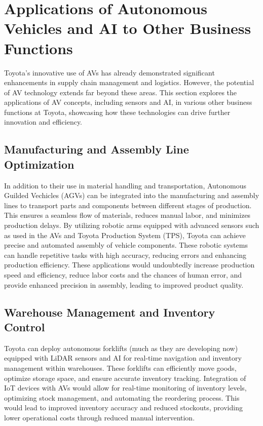 \section{Applications of Autonomous Vehicles and AI to Other Business Functions}

Toyota's innovative use of AVs has already demonstrated significant enhancements in supply chain management and logistics. However, the potential of AV technology extends far beyond these areas. This section explores the applications of AV concepts, including sensors and AI, in various other business functions at Toyota, showcasing how these technologies can drive further innovation and efficiency.

\subsection{Manufacturing and Assembly Line Optimization}
In addition to their use in material handling and transportation, Autonomous Guilded Vechicles (AGVs) can be integrated into the manufacturing and assembly lines to transport parts and components between different stages of production. This ensures a seamless flow of materials, reduces manual labor, and minimizes production delays. By utilizing robotic arms equipped with advanced sensors such as used in the AVs and Toyota Production System (TPS), Toyota can achieve precise and automated assembly of vehicle components. These robotic systems can handle repetitive tasks with high accuracy, reducing errors and enhancing production efficiency. These applications would undoubtedly increase production speed and efficiency, reduce labor costs and the chances of human error, and provide enhanced precision in assembly, leading to improved product quality. 

\subsection{Warehouse Management and Inventory Control}
Toyota can deploy autonomous forklifts (much as they are developing now) equipped with LiDAR sensors and AI for real-time navigation and inventory management within warehouses. These forklifts can efficiently move goods, optimize storage space, and ensure accurate inventory tracking. Integration of IoT devices with AVs would allow for real-time monitoring of inventory levels, optimizing stock management, and automating the reordering process. This would lead to improved inventory accuracy and reduced stockouts, providing lower operational costs through reduced manual intervention. 

